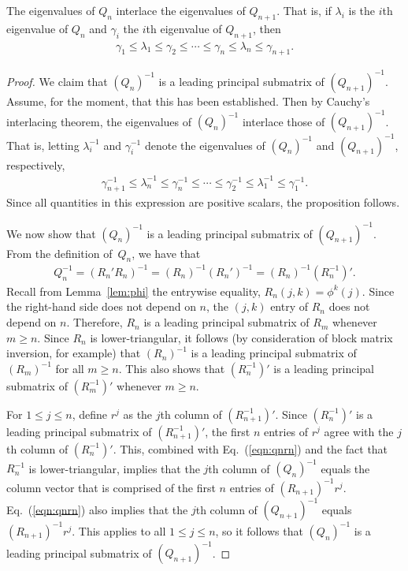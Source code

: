 \documentclass[12pt,reqno]{article}
\begin{document}
\begin{proposition}
The eigenvalues of $Q_n$ interlace the eigenvalues of $Q_{n+1}$. 
That is, if $\lambda_{i}$ is the $i$th eigenvalue of $Q_n$ and $\gamma_{i}$ the $i$th eigenvalue of $Q_{n+1}$, then
\begin{align*} \gamma_{1}\leq \lambda_{1}\leq \gamma_{2}\leq \cdots \leq \gamma_{n}\leq \lambda_n\leq \gamma_{n+1}.\end{align*}
\end{proposition}
\begin{proof}
We claim that $(Q_{n})^{-1}$ is a leading principal submatrix of $(Q_{n+1})^{-1}$. 
Assume, for the moment, that this has been established.  Then by Cauchy's interlacing theorem, 
the eigenvalues of $(Q_{n})^{-1}$ interlace those of $(Q_{n+1})^{-1}$. That is, letting $\lambda_{i}^{-1}$ and $\gamma_{i}^{-1}$ denote the eigenvalues 
of $(Q_{n})^{-1}$ and $(Q_{n+1})^{-1}$, respectively, 
\begin{align*} \gamma_{n+1}^{-1}\leq \lambda_{n}^{-1}\leq \gamma_{n}^{-1} \leq \cdots \leq  \gamma_{2}^{-1}\leq \lambda_{1}^{-1}\leq \gamma_{1}^{-1}.\end{align*}
Since all quantities in this expression are positive scalars, the proposition follows.

We now show that $(Q_{n})^{-1}$ is a leading principal submatrix of $(Q_{n+1})^{-1}$.  
From the definition of~$Q_n$, we have that
\begin{align}
Q_{n}^{-1} = (R_{n}'R_{n})^{-1} =(R_{n})^{-1}(R_{n}')^{-1} = (R_{n})^{-1}(R_{n}^{-1})'.\label{eqn:qnrn}
\end{align} 
Recall from Lemma~\ref{lem:phi} the entrywise equality, $R_{n}(j,k)=\phi^{k}(j)$. Since the right-hand side does not depend on $n$, the $(j,k)$ entry 
of $R_{n}$ does not depend on $n$. Therefore, $R_{n}$ is a leading principal submatrix of $R_{m}$ whenever $m\geq n$.
Since $R_{n}$ is lower-triangular, it follows (by consideration of block matrix inversion, for example) that $(R_{n})^{-1}$ is a 
leading principal submatrix of $(R_{m})^{-1}$ for all $m\geq n$.
This also shows that $(R_{n}^{-1})'$ is a leading principal submatrix of $(R_{m}^{-1})'$ whenever $m\geq n$. 

For $1\leq j\leq n$, define $r^j$ as the $j$th column of $(R_{n+1}^{-1})'$. 
Since $(R_{n}^{-1})'$ is a leading principal submatrix of $(R_{n+1}^{-1})'$, the first $n$ entries of $r^j$ agree with the $j$th column of $(R_{n}^{-1})'$.
This, combined with Eq.~(\ref{eqn:qnrn}) and the fact that $R_{n}^{-1}$ is lower-triangular, implies that the 
$j$th column of $(Q_{n})^{-1}$ equals the column vector that is comprised 
of the first $n$ entries of $(R_{n+1})^{-1} r^j$. 
Eq.~(\ref{eqn:qnrn}) also implies that the $j$th column of $(Q_{n+1})^{-1}$ equals $(R_{n+1})^{-1} r^j$. This applies to all 
$1\leq j\leq n$, so it follows that $(Q_{n})^{-1}$ is a leading principal submatrix of  $(Q_{n+1})^{-1}$.
\end{proof}
\end{document}
